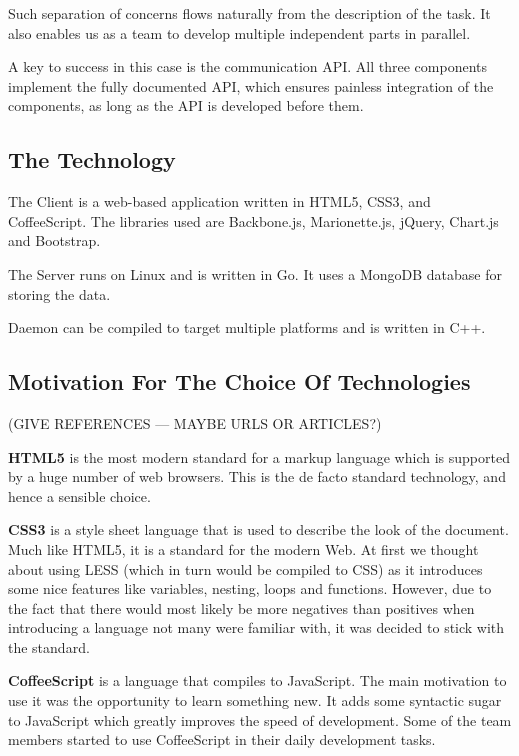 \documentclass{l3proj}
\begin{document}
Such separation of concerns flows naturally from the description of the task. It also enables us as a team to develop multiple independent parts in parallel.

A key to success in this case is the communication API. All three components implement the fully documented API, which ensures painless integration of the components, as long as the API is developed before them.

\subsection{The Technology}

The Client is a web-based application written in HTML5, CSS3, and CoffeeScript. The libraries used are Backbone.js, Marionette.js, jQuery, Chart.js and Bootstrap.

The Server runs on Linux and is written in Go. It uses a MongoDB database for storing the data.

Daemon can be compiled to target multiple platforms and is written in C++.

\subsection{Motivation For The Choice Of Technologies}

(GIVE REFERENCES --- MAYBE URLS OR ARTICLES?)

\textbf{HTML5} is the most modern standard for a markup language which is supported by a huge number of web browsers. This is the de facto standard technology, and hence a sensible choice.

\textbf{CSS3} is a style sheet language that is used to describe the look of the document. Much like HTML5, it is a standard for the modern Web. At first we thought about using LESS (which in turn would be compiled to CSS) as it introduces some nice features like variables, nesting, loops and functions. However, due to the fact that there would most likely be more negatives than positives when introducing a language not many were familiar with, it was decided to stick with the standard.

\textbf{CoffeeScript} is a language that compiles to JavaScript. The main motivation to use it was the opportunity to learn something new. It adds some syntactic sugar to JavaScript which greatly improves the speed of development. Some of the team members started to use CoffeeScript in their daily development tasks.
\end{document}
